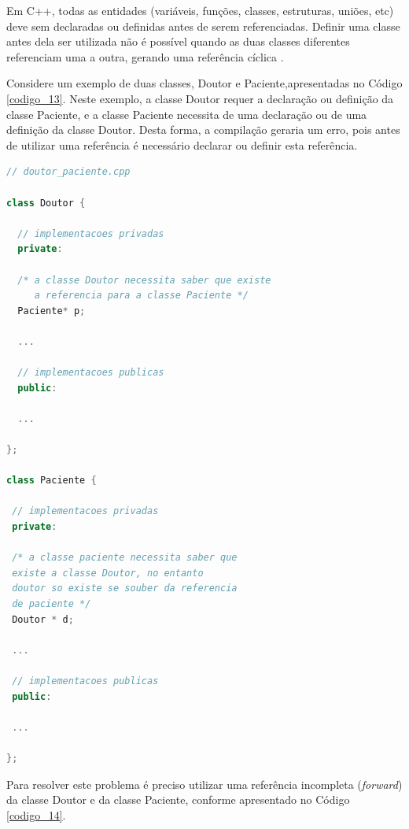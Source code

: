 Em C++, todas as entidades (variáveis, funções, classes, estruturas, uniões,
 etc) deve sem declaradas ou definidas antes de serem referenciadas. Definir
 uma classe antes dela ser utilizada não é possível quando as duas classes
 diferentes referenciam uma a outra, gerando uma referência cíclica
\cite{ref43}.

Considere um exemplo de duas classes, Doutor e Paciente,apresentadas no 
Código \ref{codigo_13}. Neste exemplo, a classe Doutor requer a 
declaração ou definição da classe Paciente, e a classe Paciente necessita 
de uma declaração ou de uma definição da classe Doutor. Desta forma, a 
compilação geraria um erro, pois antes de utilizar uma referência é 
necessário declarar ou definir esta referência.

\begin{lstlisting}[language=C++,caption={
                        Implementação de classes Paciente e Doutor},
                                                     label=codigo_13]
// doutor_paciente.cpp

class Doutor {

  // implementacoes privadas
  private:

  /* a classe Doutor necessita saber que existe 
     a referencia para a classe Paciente */
  Paciente* p; 

  ...          

  // implementacoes publicas
  public:

  ...	

};

class Paciente {

 // implementacoes privadas
 private:

 /* a classe paciente necessita saber que 
 existe a classe Doutor, no entanto
 doutor so existe se souber da referencia
 de paciente */
 Doutor * d; 

 ...  

 // implementacoes publicas
 public:

 ...  

};

\end{lstlisting}

Para resolver este problema é preciso utilizar uma 
referência incompleta (\textit{forward}) da classe Doutor e da
 classe Paciente, conforme apresentado no Código \ref{codigo_14}. 

